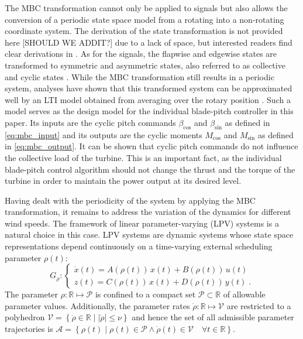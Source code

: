 \documentclass[times]{weauth}
\newcommand{\of}[1]{\!\left(#1\right)}
\begin{document}
The MBC transformation cannot only be applied to signals but also allows the conversion of a periodic state space model from a rotating into a non-rotating coordinate system.
The derivation of the state transformation is not provided here [SHOULD WE ADDIT?] due to a lack of space, but interested readers find clear derivations in \cite{Bir08,Seiler_13}.
As for the signals, the flapwise and edgewise states are transformed to symmetric
and asymmetric states, also referred to as collective and cyclic states \cite{bir97}. 
While the MBC transformation still results in a periodic system,
analyses have shown that this transformed system can be approximated well by an
LTI model obtained from averaging over the rotary position \cite{Bir08}.
Such a model serves as the design model for the individual blade-pitch
controller in this paper.
Its inputs are the cyclic pitch commands $\beta_\text{cos}$ and
$\beta_\text{sin}$ as defined in \eqref{eq:mbc_input} and its outputs are
the cyclic moments $M_\text{cos}$ and $M_\text{sin}$ as defined in
\eqref{eq:mbc_output}.
It can be shown that cyclic pitch commands do not influence the collective
load of the turbine. 
This is an important fact, as the individual blade-pitch control algorithm should not change the thrust and the torque of the turbine in order to maintain the power output at its desired level.

Having dealt with the periodicity of the system by applying the MBC transformation, it remains to address the variation of the dynamics for different wind speeds.
The framework of linear parameter-varying (LPV) systems is a natural choice in this case. 
LPV systems are dynamic systems whose state space representations depend continuously on a time-varying external scheduling parameter $\rho\of{t}$:
\begin{equation}\label{eq:lpv_parametric}
G_\rho\colon
\begin{cases}
\dot{x}\!\left(t\right) =
A\!\left(\rho\of{t}\right)\,x\!\left(t\right) +
B\!\left(\rho\of{t}\right)\,u\!\left(t\right)
			  \\
z\!\left(t\right) =
C\!\left(\rho\of{t}\right)\,x\!\left(t\right) +
D\!\left(\rho\of{t}\right)\,y\!\left(t\right)\;.
\end{cases}
\end{equation} 
The parameter  $\rho\colon \mathds{R}\!\mapsto\!\mathcal{P}$ is confined to a compact set $\mathcal{P}\subset\mathds{R}$ of allowable parameter values. 
Additionally, the parameter rates $\dot{\rho}\colon
\mathds{R} \!\mapsto\! \mathcal{V}$ are restricted to a polyhedron
$\mathcal{V}= \left\{\dot{\rho}\in\mathds{R} \mid |\dot{\rho}| \leq \nu\right\}$ and hence the set of all admissible parameter trajectories is $\mathcal{A} = \left\{\rho(t) \mid \rho\of{t}\in\mathcal{P} \wedge \dot{\rho}\of{t}\in\mathcal{V} \quad \forall t\in\mathds{R}\right\}$.
\end{document}
